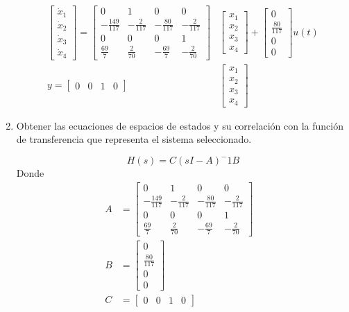 \documentclass{article}
\begin{document}
\begin{enumerate}
  \begin{align}
    \begin{bmatrix}
      \dot{x}_1 \\ \dot{x}_2 \\ \dot{x}_3 \\ \dot{x}_4
    \end{bmatrix} =
    \begin{bmatrix}
      0 & 1 & 0 & 0\\
      -\frac{149}{117} & -\frac{2}{117} & -\frac{80}{117} & -\frac{2}{117}\\
      0 & 0 & 0 & 1\\
      \frac{69}{7} & \frac{2}{70} & -\frac{69}{7} & -\frac{2}{70}
    \end{bmatrix}&
    \begin{bmatrix}
      x_1 \\ x_2 \\ x_3 \\ x_4
    \end{bmatrix} + 
    \begin{bmatrix}
      0 \\ \frac{80}{117} \\ 0 \\ 0
    \end{bmatrix}
    u(t)\\
    y =
    \begin{bmatrix}
      0 & 0 & 1 & 0
    \end{bmatrix}&
    \begin{bmatrix}
      x_1 \\ x_2 \\ x_3 \\ x_4
    \end{bmatrix}
  \end{align}

\item Obtener las ecuaciones de espacios de estados y su correlación con la función de transferencia que representa el sistema seleccionado.

\begin{equation*}
  H(s) = C(sI-A)^-1B
\end{equation*}
Donde
\begin{align*}
  A &=
  \begin{bmatrix}
    0 & 1 & 0 & 0\\
    -\frac{149}{117} & -\frac{2}{117} & -\frac{80}{117} & -\frac{2}{117}\\
    0 & 0 & 0 & 1\\
    \frac{69}{7} & \frac{2}{70} & -\frac{69}{7} & -\frac{2}{70}
  \end{bmatrix}\\
  B &= 
  \begin{bmatrix}
    0 \\ \frac{80}{117} \\ 0 \\ 0
  \end{bmatrix}\\
  C &= 
  \begin{bmatrix}
    0 & 0 & 1 & 0
  \end{bmatrix}&
\end{align*}


\end{enumerate}
\end{document}
